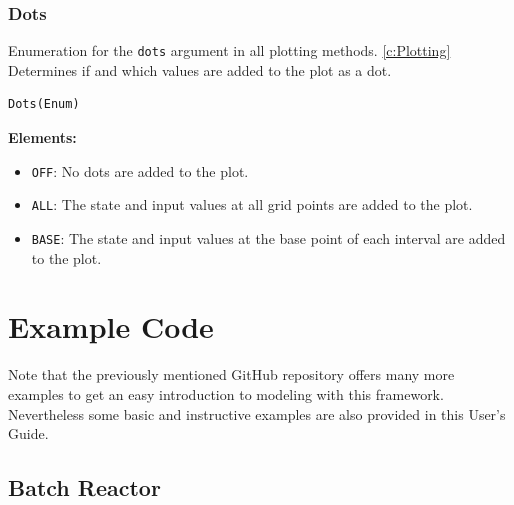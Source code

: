 \documentclass[12pt]{article}
\begin{document}
\subsubsection{Dots}
\label{c:Dots}
\begin{mdframed}[backgroundcolor=gray!10, roundcorner=10pt,
		linewidth=1pt]
	Enumeration for the \texttt{dots} argument in all plotting methods.
	\eqref{c:Plotting} Determines if and which values are added to the plot
	as a dot.

	\begin{lstlisting}
Dots(Enum)
	\end{lstlisting}
	\label{enum:Dots}
	\textbf{Elements:}
	\begin{itemize}
		\item \texttt{OFF}: No dots are added to the plot.
		\item \texttt{ALL}: The state and input values at all grid
		      points are added to the plot.
		\item \texttt{BASE}: The state and input values at the base
		      point of each interval are added to the plot.
	\end{itemize}

\end{mdframed}
\newpage
\section{Example Code}

Note that the previously mentioned GitHub repository offers many more examples
to get an easy introduction to modeling with this framework. Nevertheless some
basic and instructive examples are also provided in this User's Guide.

\subsection{Batch Reactor}
\end{document}
